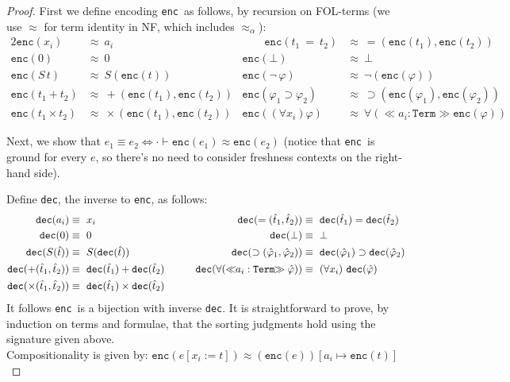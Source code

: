 \documentclass[11pt,a4paper]{amsart}
\newcounter{s}
\newcommand{\absort}[2]{\ensuremath{\ll\!\!#1\!\!\gg #2}}
\newcommand{\emptyCtx}{\cdot}
\newcommand {\al}       [0] {{\approx_\alpha}}
\newcommand {\aleq}     [0] {\mathrel{\al}}
\newcommand{\Trm}{\texttt{Term}}
\newcommand{\enc}{\texttt{enc}}
\newcommand{\dec}{\texttt{dec}}
\begin{document}
\begin{proof}
First we define encoding \enc\ as follows, by recursion on FOL-terms (we use $\approx$ for term identity in NF, which includes $\aleq$):
\begin{alignat*}{2}
\enc(x_i) & \approx \  a_i     & \qquad \enc(t_1 \ = \  t_2) & \approx \ =(\enc(t_1), \enc(t_2)) \\
\enc(0) & \approx \  0         &    \enc(\bot) & \approx \  \bot \\
\enc(S\,t) & \approx \  S(\enc(t)) & \enc(\neg\,\varphi) & \approx \  \neg(\enc(\varphi)) \\
\enc(t_1 + t_2) & \approx \  +(\enc(t_1), \enc(t_2)) & \enc(\varphi_1 \supset \varphi_2) & \approx \  \supset(\enc(\varphi_1), \enc(\varphi_2)) \\
\enc(t_1 \times t_2) & \approx \  \times(\enc(t_1), \enc(t_2)) & \enc((\forall x_i)\varphi) & \approx \  \forall (\absort{a_i:\Trm}\enc(\varphi))
\end{alignat*}

\noindent
Next, we show that $e_1 \equiv e_2 \iff \emptyCtx \vdash \enc(e_1) \approx \enc(e_2)$
 (notice that \enc\ is ground for every $e$, so there's no need to consider freshness contexts on the right-hand side).

\noindent
Define \dec, the inverse to \enc, as follows:
%
\begin{alignat*}{2}
\dec(a_i) & \equiv \ x_i & 
    \dec(=(\hat{t}_1, \hat{t}_2)) & \equiv \ \dec(\hat{t}_1) = \dec(\hat{t}_2) \\
\dec(0) & \equiv \ 0 & 
    \dec(\bot) & \equiv \ \bot \\
\dec(S(\hat{t})) & \equiv \ S(\dec(\hat{t})) & 
    \dec(\supset(\hat{\varphi}_1, \hat{\varphi}_2)) & \equiv \ \dec(\hat{\varphi}_1) \supset \dec(\hat{\varphi}_2) \\
\dec(+(\hat{t}_1, \hat{t}_2)) & \equiv \ \dec(\hat{t}_1) + \dec(\hat{t}_2) & 
    \qquad\dec(\forall(\absort{a_i:\Trm}\hat{\varphi})) & \equiv \ (\forall x_i)\ \dec(\hat{\varphi}) \\
\dec(\times(\hat{t}_1, \hat{t}_2)) & \equiv \ \dec(\hat{t}_1) \times \dec(\hat{t}_2) & 
\phantom{2} & \phantom{=} \phantom{b}
\end{alignat*}
%
\noindent
It follows \enc\ is a bijection with inverse \dec. It is straightforward to prove, by induction on terms and formulae, that the sorting judgments hold using the signature given above.\\

\noindent Compositionality is given by:
$\enc(e[x_i{:=}t]) \approx (\enc(e))[a_i \mapsto \enc(t)]$
\end{proof}
\end{document}
